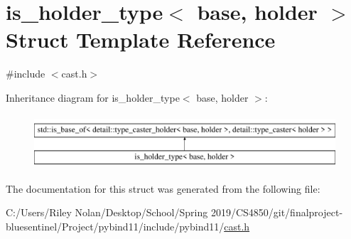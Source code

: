 \hypertarget{structis__holder__type}{}\section{is\+\_\+holder\+\_\+type$<$ base, holder $>$ Struct Template Reference}
\label{structis__holder__type}


{\ttfamily \#include $<$cast.\+h$>$}

Inheritance diagram for is\+\_\+holder\+\_\+type$<$ base, holder $>$\+:\begin{figure}[H]
\begin{center}
\leavevmode
\includegraphics[height=2.000000cm]{structis__holder__type}
\end{center}
\end{figure}


The documentation for this struct was generated from the following file\+:\begin{DoxyCompactItemize}
\item 
C\+:/\+Users/\+Riley Nolan/\+Desktop/\+School/\+Spring 2019/\+C\+S4850/git/finalproject-\/bluesentinel/\+Project/pybind11/include/pybind11/\mbox{\hyperlink{cast_8h}{cast.\+h}}\end{DoxyCompactItemize}
